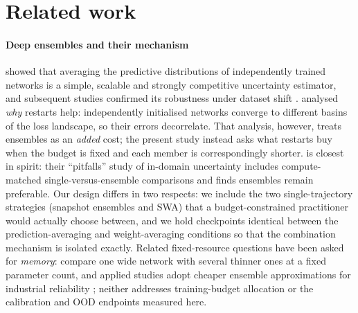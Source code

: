 \documentclass[11pt,a4paper]{article}
\newcommand{\swa}{\textsc{SWA}}
\begin{document}
\section{Related work}\label{sec:related}

\paragraph{Deep ensembles and their mechanism}
\citet{lakshminarayanan2017} showed that averaging the predictive
distributions of independently trained networks is a simple, scalable and
strongly competitive uncertainty estimator, and subsequent studies confirmed
its robustness under dataset shift \citep{ovadia2019}.
\citet{fort2019} analysed \emph{why} restarts help: independently
initialised networks converge to different basins of the loss landscape, so
their errors decorrelate. That analysis, however, treats ensembles as an
\emph{added} cost; the present study instead asks what restarts buy when
the budget is fixed and each member is correspondingly shorter.
\citet{ashukha2020} is closest in spirit: their ``pitfalls'' study of
in-domain uncertainty includes compute-matched single-versus-ensemble
comparisons and finds ensembles remain preferable. Our design differs in
two respects: we include the two single-trajectory strategies (snapshot
ensembles and \swa) that a budget-constrained practitioner would actually
choose between, and we hold checkpoints identical between the
prediction-averaging and weight-averaging conditions so that the combination
mechanism is isolated exactly. Related fixed-resource questions have been
asked for \emph{memory}: \citet{chirkova2020} compare one wide network with
several thinner ones at a fixed parameter count, and applied studies adopt
cheaper ensemble approximations for industrial reliability
\citep{thuy2024}; neither addresses training-budget allocation or the
calibration and OOD endpoints measured here.
\end{document}
